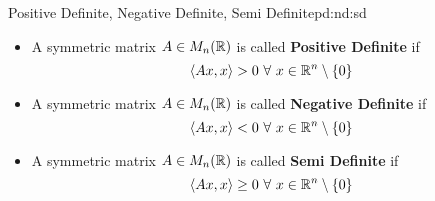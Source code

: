 \documentclass[../Analysis-3.tex]{subfiles}
\begin{document}
\begin{Def}{Positive Definite, Negative Definite, Semi Definite}{pd:nd:sd}
  \begin{itemize}
    \item A symmetric matrix $A \in M_n(\mathbb{R})$ is called \textbf{Positive Definite} if \[ \left\langle Ax, x \right\rangle > 0 \ \forall\ x \in \R^n \setminus \{0\} \]
    \item A symmetric matrix $A \in M_n(\mathbb{R})$ is called \textbf{Negative Definite} if \[ \left\langle Ax, x \right\rangle < 0 \ \forall\ x \in \R^n \setminus \{0\} \]
    \item A symmetric matrix $A \in M_n(\mathbb{R})$ is called \textbf{Semi Definite} if \[ \left\langle Ax, x \right\rangle \geq 0 \ \forall\ x \in \R^n \setminus \{0\} \]
  \end{itemize}
\end{Def}
\end{document}

